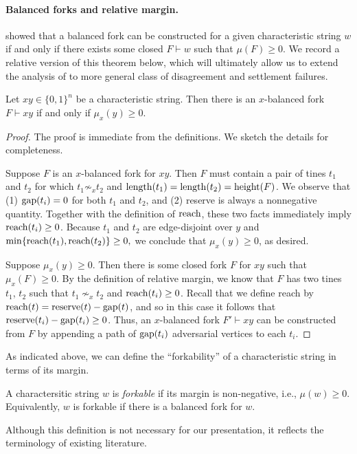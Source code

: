 \paragraph{Balanced forks and relative margin.}
\citet{KRDO17} showed that a balanced fork can be constructed for a
given characteristic string $w$ if and only if there exists some
closed $F\vdash w$ such that $\mu(F)\geq 0$.  We record a relative
version of this theorem below, which will ultimately allow us to
extend the analysis of \cite{KRDO17} to more general class of
disagreement and settlement failures.

\begin{fact}\label{fact:margin-balance}
  Let $xy \in \{0,1\}^n$ be a characteristic string. Then there is an
  $x$-balanced fork $F \vdash xy$ if and only if $\mu_x(y) \geq 0$.
\end{fact}

\begin{proof}
  The proof is immediate from the definitions. We sketch the details for completeness.
  
  Suppose $F$ is an $x$-balanced fork for $xy$. Then $F$ must contain a pair of tines $t_1$ and $t_2$ for which
  $t_1 \not\sim_x t_2$ and $\operatorname{length}(t_1) = \operatorname{length}(t_2) = \operatorname{height}(F)$. We observe that (1) $\operatorname{gap}(t_i)=0$ for both $t_1$ and $t_2$, and (2) reserve is always a nonnegative quantity. Together with the definition of $\operatorname{reach}$, these two facts immediately imply $\operatorname{reach}(t_i) \geq 0$. Because $t_1$ and $t_2$ are edge-disjoint over $y$ and $\min\{\operatorname{reach}(t_1),\operatorname{reach}(t_2)\}\geq0,$ we conclude that $\mu_x(y)\geq 0$, as desired. 

  Suppose $\mu_x(y)\geq 0$. Then there is some closed fork $F$ for $xy$ such that $\mu_x(F)\geq0$. By the definition of
   relative margin, we know that $F$ has two tines $t_1$, $t_2$ such that $t_1\nsim_x t_2$ and 
  $\operatorname{reach}(t_i)\geq0$. Recall that we define reach by $\operatorname{reach}(t)=\operatorname{reserve}(t)-\operatorname{gap}(t)$, and so in this case 
 it follows that $\operatorname{reserve}(t_i) - \operatorname{gap}(t_i)\geq0$. Thus, an $x$-balanced fork $F'\vdash xy$ can be constructed from $F$ by 
 appending a path of $\operatorname{gap}(t_i)$ adversarial vertices to each $t_i$.
\end{proof}

As indicated above, we can define the ``forkability'' of a
characteristic string in terms of its margin.
\begin{definition}\label{def:forkable}
  A charactersitic string $w$ is \emph{forkable} if its margin is non-negative, i.e., $\mu(w) \geq 0$.
  Equivalently, $w$ is forkable if there is a balanced fork for $w$.
\end{definition}
Although this definition is not necessary for our presentation, it
reflects the terminology of existing literature.

